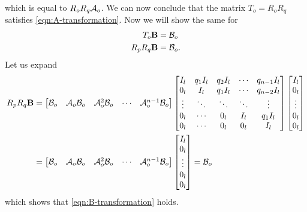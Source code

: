 \begin{appendices}
\begin{equation*}
\end{equation*}
which is equal to $R_oR_q\mathcal{A}_o$. We can now conclude that the matrix $T_o=R_oR_q$ satisfies \eqref{eqn:A-transformation}. Now we will show the same for
\begin{equation}\label{eqn:B-transformation}
    \begin{split}
        T_o\mathbf{B} &= \mathcal{B}_o \\
        R_pR_q\mathbf{B} &= \mathcal{B}_o.
    \end{split}
\end{equation}
Let us expand
\begin{equation*}
    \begin{split}
        R_pR_q\mathbf{B} &=
        \begin{bmatrix}
            \mathcal{B}_o & \mathcal{A}_o\mathcal{B}_o & \mathcal{A}^{2}_o\mathcal{B}_o & \cdots & \mathcal{A}^{n-1}_o\mathcal{B}_o \\
        \end{bmatrix}
        \begin{bmatrix}
            I_l & q_1I_l & q_2I_l & \cdots & q_{n-1}I_l \\
            0_l & I_l & q_1I_l & \cdots & q_{n-2}I_l \\
            \vdots & \ddots & \ddots & \ddots & \vdots \\
            0_l & \cdots & 0_l & I_l & q_1I_l \\
            0_l & \cdots & 0_l & 0_l & I_l \\
        \end{bmatrix}
        \begin{bmatrix}
            I_l \\ 0_l \\ \vdots \\ 0_l \\ 0_l \\
        \end{bmatrix} \\
        &=
        \begin{bmatrix}
            \mathcal{B}_o & \mathcal{A}_o\mathcal{B}_o & \mathcal{A}^{2}_o\mathcal{B}_o & \cdots & \mathcal{A}^{n-1}_o\mathcal{B}_o \\
        \end{bmatrix}
        \begin{bmatrix}
            I_l \\ 0_l \\ \vdots \\ 0_l \\ 0_l \\
        \end{bmatrix} = \mathcal{B}_o \\
    \end{split}
\end{equation*}
which shows that \eqref{eqn:B-transformation} holds.
    

\end{appendices}
